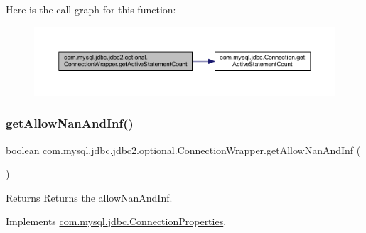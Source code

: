 Here is the call graph for this function\+:
\nopagebreak
\begin{figure}[H]
\begin{center}
\leavevmode
\includegraphics[width=350pt]{classcom_1_1mysql_1_1jdbc_1_1jdbc2_1_1optional_1_1_connection_wrapper_a72b79457a247fb0cedc5437e3d0d4cf2_cgraph}
\end{center}
\end{figure}
\mbox{\label{classcom_1_1mysql_1_1jdbc_1_1jdbc2_1_1optional_1_1_connection_wrapper_ae732025b7fe6d97377f2bd477fb87aea}} 
\subsubsection{\texorpdfstring{get\+Allow\+Nan\+And\+Inf()}{getAllowNanAndInf()}}
{\footnotesize\ttfamily boolean com.\+mysql.\+jdbc.\+jdbc2.\+optional.\+Connection\+Wrapper.\+get\+Allow\+Nan\+And\+Inf (\begin{DoxyParamCaption}{ }\end{DoxyParamCaption})}

\begin{DoxyReturn}{Returns}
Returns the allow\+Nan\+And\+Inf. 
\end{DoxyReturn}


Implements \mbox{\hyperlink{interfacecom_1_1mysql_1_1jdbc_1_1_connection_properties_a2da790a00e98b06833dc0856c42d638a}{com.\+mysql.\+jdbc.\+Connection\+Properties}}.

